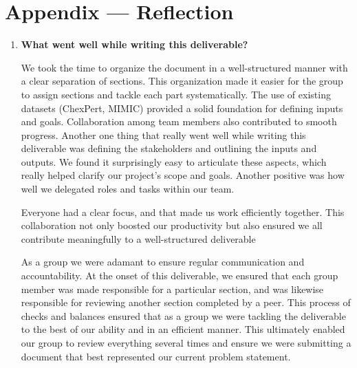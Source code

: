 \documentclass{article}
\begin{document}
\newpage{}

\section*{Appendix --- Reflection}

\begin{enumerate}
    \item \textbf{What went well while writing this deliverable?} 
    \begin{itemize}
        \begin{item}
            We took the time to organize the document in a well-structured manner with a clear separation of sections. This organization made it easier for the group to assign sections and tackle each part systematically.  The use of existing datasets (ChexPert, MIMIC) provided a solid foundation for defining inputs and goals. Collaboration among team members also contributed to smooth progress. Another one thing that really went well while writing this deliverable was defining the stakeholders and outlining the inputs and outputs. We found it surprisingly easy to articulate these aspects, which really helped clarify our project’s scope and goals. Another positive was how well we delegated roles and tasks within our team. 
        \end{item}
        \begin{item}
            Everyone had a clear focus, and that made us work efficiently together. This collaboration not only boosted our productivity but also ensured we all contribute meaningfully to a well-structured deliverable
        \end{item}
        \begin{item}
            As a group we were adamant to ensure regular communication and accountability. At the onset of this deliverable, we ensured that each group member was made responsible for a particular section, and was likewise responsible for reviewing another section completed by a peer. This process of checks and balances ensured that as a group we were tackling the deliverable to the best of our ability and in an efficient manner. This ultimately enabled our group to review everything several times and ensure we were submitting a document that best represented our current problem statement.
        \end{item}
    \end{itemize}


\end{enumerate}
\end{document}
